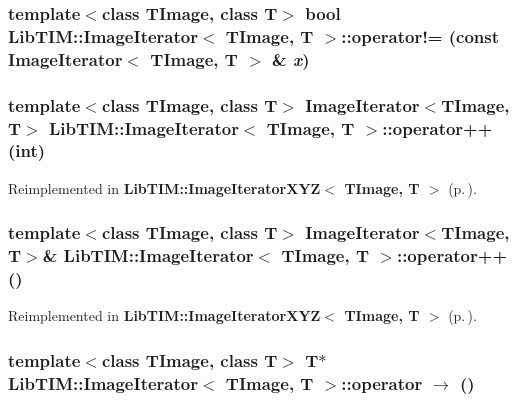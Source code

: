\subsubsection{\setlength{\rightskip}{0pt plus 5cm}template$<$class TImage, class T$>$ bool {\bf Lib\-TIM::Image\-Iterator}$<$ TImage, T $>$::operator!= (const {\bf Image\-Iterator}$<$ TImage, T $>$ \& {\em x})\hspace{0.3cm}{\tt  [inline]}}\label{classLibTIM_1_1ImageIterator_a7}


\subsubsection{\setlength{\rightskip}{0pt plus 5cm}template$<$class TImage, class T$>$ {\bf Image\-Iterator}$<$TImage, T$>$ {\bf Lib\-TIM::Image\-Iterator}$<$ TImage, T $>$::operator++ (int)\hspace{0.3cm}{\tt  [inline]}}\label{classLibTIM_1_1ImageIterator_a5}




Reimplemented in {\bf Lib\-TIM::Image\-Iterator\-XYZ$<$ TImage, T $>$} {\rm (p.\,\pageref{classLibTIM_1_1ImageIteratorXYZ_a7})}.
\subsubsection{\setlength{\rightskip}{0pt plus 5cm}template$<$class TImage, class T$>$ {\bf Image\-Iterator}$<$TImage, T$>$\& {\bf Lib\-TIM::Image\-Iterator}$<$ TImage, T $>$::operator++ ()\hspace{0.3cm}{\tt  [inline]}}\label{classLibTIM_1_1ImageIterator_a4}




Reimplemented in {\bf Lib\-TIM::Image\-Iterator\-XYZ$<$ TImage, T $>$} {\rm (p.\,\pageref{classLibTIM_1_1ImageIteratorXYZ_a6})}.
\subsubsection{\setlength{\rightskip}{0pt plus 5cm}template$<$class TImage, class T$>$ T$\ast$ {\bf Lib\-TIM::Image\-Iterator}$<$ TImage, T $>$::operator $\rightarrow$  ()\hspace{0.3cm}{\tt  [inline]}}\label{classLibTIM_1_1ImageIterator_a3}




